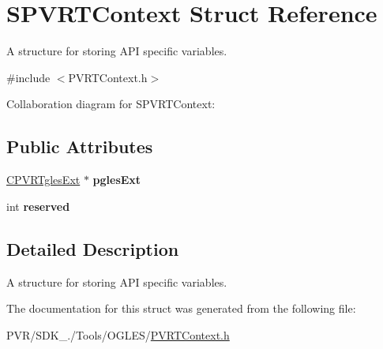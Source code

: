\hypertarget{struct_s_p_v_r_t_context}{\section{S\+P\+V\+R\+T\+Context Struct Reference}
\label{struct_s_p_v_r_t_context}
}


A structure for storing A\+P\+I specific variables.  




{\ttfamily \#include $<$P\+V\+R\+T\+Context.\+h$>$}



Collaboration diagram for S\+P\+V\+R\+T\+Context\+:
\subsection*{Public Attributes}
\begin{DoxyCompactItemize}
\item 
\hypertarget{struct_s_p_v_r_t_context_a90c902de1f2d252566521471ce7a6041}{\hyperlink{class_c_p_v_r_tgles_ext}{C\+P\+V\+R\+Tgles\+Ext} $\ast$ {\bfseries pgles\+Ext}}\label{struct_s_p_v_r_t_context_a90c902de1f2d252566521471ce7a6041}

\item 
\hypertarget{struct_s_p_v_r_t_context_aa2226a4f6f4760d1ccada08fd607182d}{int {\bfseries reserved}}\label{struct_s_p_v_r_t_context_aa2226a4f6f4760d1ccada08fd607182d}

\end{DoxyCompactItemize}


\subsection{Detailed Description}
A structure for storing A\+P\+I specific variables. 



 

The documentation for this struct was generated from the following file\+:\begin{DoxyCompactItemize}
\item 
P\+V\+R/\+S\+D\+K\+\_./\+Tools/\+O\+G\+L\+E\+S/\hyperlink{_p_v_r_t_context_8h}{P\+V\+R\+T\+Context.\+h}\end{DoxyCompactItemize}
